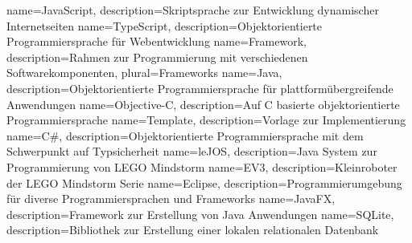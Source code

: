 
{
	name=JavaScript,
	description={Skriptsprache zur Entwicklung dynamischer Internetseiten}
}
{
	name=TypeScript,
	description={Objektorientierte Programmiersprache für Webentwicklung}
}
{
	name=Framework,
	description={Rahmen zur Programmierung mit verschiedenen Softwarekomponenten},
	plural=Frameworks
}
{
	name=Java,
	description={Objektorientierte Programmiersprache für plattformübergreifende Anwendungen}
}
{
	name=Objective-C,
	description={Auf C basierte objektorientierte Programmiersprache}
}
{
	name=Template,
	description={Vorlage zur Implementierung}
}
{
	name=C\#,
	description={Objektorientierte Programmiersprache mit dem Schwerpunkt auf Typsicherheit}
}
{
	name=leJOS,
	description={Java System zur Programmierung von LEGO Mindstorm}
}
{
	name=EV3,
	description={Kleinroboter der LEGO Mindstorm Serie}
}
{
	name=Eclipse,
	description={Programmierumgebung für diverse Programmiersprachen und Frameworks}
}
{
	name=JavaFX,
	description={Framework zur Erstellung von Java Anwendungen}
}
{
	name=SQLite,
	description={Bibliothek zur Erstellung einer lokalen relationalen Datenbank}
}

